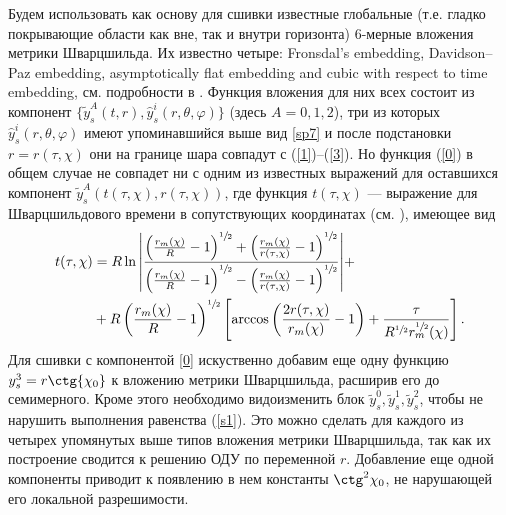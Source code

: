 \documentclass[12pt]{article}
\newcommand{\bq}{\begin{equation}}
\newcommand{\eq}{\end{equation}}
\newcommand{\ff}{\varphi}
\newcommand{\te}{\theta}
\begin{document}
Будем использовать как основу для сшивки известные глобальные (т.е. гладко покрывающие области как вне, так и внутри горизонта)
6-мерные вложения \cite{statja27} метрики Шварцшильда.
Их известно четыре: Fronsdal’s embedding,  Davidson–Paz embedding, asymptotically flat embedding and cubic with respect to time embedding,
см. подробности в \cite{statja27}.
Функция вложения для них всех состоит из компонент $\{\tilde y_s^A(t,r),\hat y_s^i(r,\te,\ff)\}$ (здесь $A=0,1,2$),
три из которых $\hat y_s^i(r,\te,\ff)$ имеют упоминавшийся выше вид \eqref{sp7}
и после подстановки $r = r(\tau, \chi)$ они на границе шара совпадут с (\ref{1})--(\ref{3}).
Но функция (\ref{0}) в общем случае не совпадет ни с одним из известных выражений
для оставшихся компонент $\tilde y_s^A(t(\tau, \chi),r(\tau, \chi))$,
где функция $t(\tau, \chi)$ --- выражение для
Шварцшильдового времени в сопутствующих координатах (см. \cite{misner}), имеющее вид
\bq
\begin{split}
	t(\tau, \chi) &= R \ln{\left| \frac{\left( \frac{r_m(\chi)}{R} -1 \right)^{\sfrac{1}{2}}+\left( \frac{r_m(\chi)}{r(\tau, \chi)} -1 \right)^{\sfrac{1}{2}}}{\left( \frac{r_m(\chi)}{R} -1 \right)^{\sfrac{1}{2}}-\left( \frac{r_m(\chi)}{r(\tau, \chi)} -1 \right)^{\sfrac{1}{2}}}\right|} + \\
	&+ R \left( \frac{r_m(\chi)}{R} -1 \right)^{\sfrac{1}{2}} \left[ \arccos{\left( \frac{2r(\tau, \chi)}{r_m(\chi)}-1\right)} + \frac{\tau}{R^{\sfrac{1}{2}} r^{\sfrac{1}{2}}_m(\chi)} \right].
\end{split}
\eq
Для сшивки с компонентой \eqref{0}
искуственно добавим еще одну функцию
$y_s^3 = r \ctg{\chi_0}$ к вложению метрики Шварцшильда, расширив его до семимерного.
Кроме этого необходимо видоизменить блок $\tilde y^0_s,\tilde y^1_s,\tilde y^2_s$, чтобы не нарушить выполнения равенства (\ref{s1}).
Это можно сделать для каждого из четырех упомянутых выше типов вложения метрики Шварцшильда, так как их построение сводится к решению ОДУ по переменной $r$. Добавление еще одной компоненты приводит к появлению в нем константы $\ctg^2{\chi_0}$, не нарушающей его локальной разрешимости. 
\end{document}
